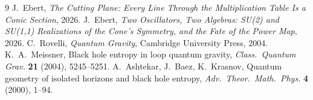 \documentclass[11pt]{amsart}
\theoremstyle{remark}
\begin{document}
\begin{thebibliography}{9}
 J.~Ebert, \emph{The Cutting Plane: Every Line Through the
Multiplication Table Is a Conic Section}, 2026.
 J.~Ebert, \emph{Two Oscillators, Two Algebras: SU(2) and
SU(1,1) Realizations of the Cone's Symmetry, and the Fate of the Power Map}, 2026.
 C.~Rovelli, \emph{Quantum Gravity}, Cambridge University Press, 2004.
 K.~A.~Meissner, Black hole entropy in loop quantum gravity,
\emph{Class.\ Quantum Grav.} \textbf{21} (2004), 5245--5251.
 A.~Ashtekar, J.~Baez, K.~Krasnov, Quantum geometry
of isolated horizons and black hole entropy, \emph{Adv.\ Theor.\ Math.\ Phys.}
\textbf{4} (2000), 1--94.
\end{thebibliography}
\end{document}
